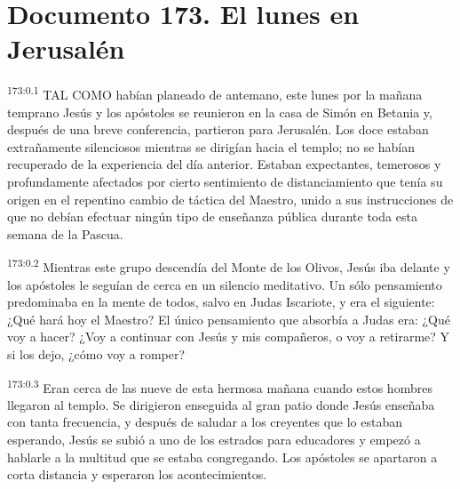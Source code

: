 \chapter{Documento 173. El lunes en Jerusalén}
\par 
\textsuperscript{173:0.1} TAL COMO habían planeado de antemano, este lunes por la mañana temprano Jesús y los apóstoles se reunieron en la casa de Simón en Betania y, después de una breve conferencia, partieron para Jerusalén. Los doce estaban extrañamente silenciosos mientras se dirigían hacia el templo; no se habían recuperado de la experiencia del día anterior. Estaban expectantes, temerosos y profundamente afectados por cierto sentimiento de distanciamiento que tenía su origen en el repentino cambio de táctica del Maestro, unido a sus instrucciones de que no debían efectuar ningún tipo de enseñanza pública durante toda esta semana de la Pascua.

\par 
\textsuperscript{173:0.2} Mientras este grupo descendía del Monte de los Olivos, Jesús iba delante y los apóstoles le seguían de cerca en un silencio meditativo. Un sólo pensamiento predominaba en la mente de todos, salvo en Judas Iscariote, y era el siguiente: ¿Qué hará hoy el Maestro? El único pensamiento que absorbía a Judas era: ¿Qué voy a hacer? ¿Voy a continuar con Jesús y mis compañeros, o voy a retirarme? Y si los dejo, ¿cómo voy a romper?

\par 
\textsuperscript{173:0.3} Eran cerca de las nueve de esta hermosa mañana cuando estos hombres llegaron al templo. Se dirigieron enseguida al gran patio donde Jesús enseñaba con tanta frecuencia, y después de saludar a los creyentes que lo estaban esperando, Jesús se subió a uno de los estrados para educadores y empezó a hablarle a la multitud que se estaba congregando. Los apóstoles se apartaron a corta distancia y esperaron los acontecimientos.


